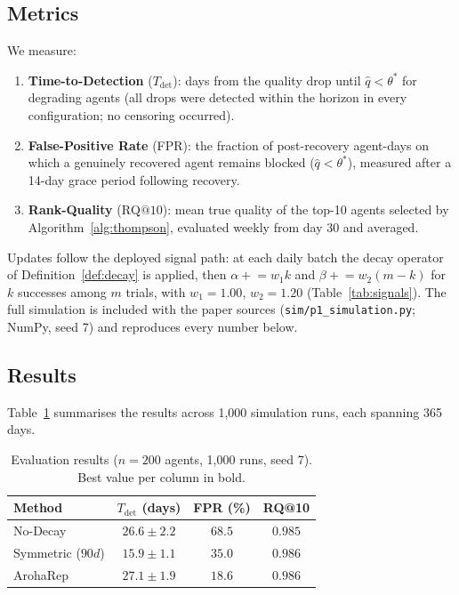 \documentclass[conference]{IEEEtran}
\begin{document}
\subsection{Metrics}

We measure:
\begin{enumerate}
  \item \textbf{Time-to-Detection} ($T_{\text{det}}$): days
    from the quality drop until $\hat{q} < \theta^*$ for
    degrading agents (all drops were detected within the
    horizon in every configuration; no censoring occurred).
  \item \textbf{False-Positive Rate} (FPR): the fraction of
    post-recovery agent-days on which a genuinely recovered
    agent remains blocked ($\hat{q} < \theta^*$), measured
    after a 14-day grace period following recovery.
  \item \textbf{Rank-Quality} ($\text{RQ}@10$): mean true
    quality of the top-10 agents selected by
    Algorithm~\ref{alg:thompson}, evaluated weekly from
    day 30 and averaged.
\end{enumerate}

Updates follow the deployed signal path: at each daily batch
the decay operator of Definition~\ref{def:decay} is applied,
then $\alpha \mathrel{+}= w_1 k$ and
$\beta \mathrel{+}= w_2 (m - k)$ for $k$ successes among $m$
trials, with $w_1 = 1.00$, $w_2 = 1.20$
(Table~\ref{tab:signals}). The full simulation is included
with the paper sources (\texttt{sim/p1\_simulation.py};
NumPy, seed 7) and reproduces every number below.

\subsection{Results}

Table~\ref{tab:results} summarises the results across 1,000
simulation runs, each spanning 365 days.

\begin{table}[t]
\centering
\caption{Evaluation results ($n=200$ agents, 1{,}000 runs,
seed 7). Best value per column in bold.}
\label{tab:results}
\begin{tabular}{lccc}
\toprule
Method & $T_{\text{det}}$ (days) & FPR (\%) & RQ@10 \\
\midrule
No-Decay             & $26.6 \pm 2.2$ & $68.5$ & $0.985$ \\
Symmetric ($90d$)    & $\mathbf{15.9 \pm 1.1}$ & $35.0$ & $0.986$ \\
ArohaRep             & $27.1 \pm 1.9$ & $\mathbf{18.6}$ & $0.986$ \\
\bottomrule
\end{tabular}
\end{table}
\end{document}
